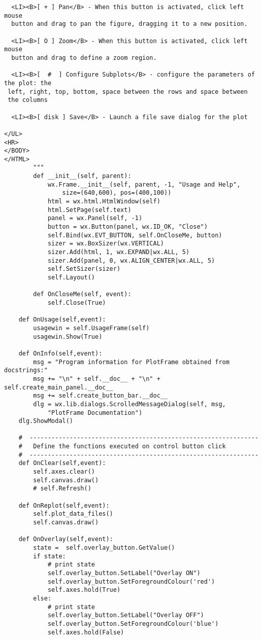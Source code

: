 \documentclass[12pt]{article}
\begin{document}
\begin{verbatim}
  <LI><B>[ + ] Pan</B> - When this button is activated, click left mouse
  button and drag to pan the figure, dragging it to a new position.

  <LI><B>[ O ] Zoom</B> - When this button is activated, click left mouse
  button and drag to define a zoom region.

  <LI><B>[  #  ] Configure Subplots</B> - configure the parameters of the plot: the
 left, right, top, bottom, space between the rows and space between
 the columns

  <LI><B>[ disk ] Save</B> - Launch a file save dialog for the plot

</UL>
<HR>
</BODY>
</HTML>
        """
        def __init__(self, parent):
            wx.Frame.__init__(self, parent, -1, "Usage and Help",
                size=(640,600), pos=(400,100))
            html = wx.html.HtmlWindow(self)
            html.SetPage(self.text)
            panel = wx.Panel(self, -1)
            button = wx.Button(panel, wx.ID_OK, "Close")
            self.Bind(wx.EVT_BUTTON, self.OnCloseMe, button)
            sizer = wx.BoxSizer(wx.VERTICAL)
            sizer.Add(html, 1, wx.EXPAND|wx.ALL, 5)
            sizer.Add(panel, 0, wx.ALIGN_CENTER|wx.ALL, 5)
            self.SetSizer(sizer)
            self.Layout()

        def OnCloseMe(self, event):
            self.Close(True)

    def OnUsage(self,event):
        usagewin = self.UsageFrame(self)
        usagewin.Show(True)

    def OnInfo(self,event):
        msg = "Program information for PlotFrame obtained from docstrings:"
        msg += "\n" + self.__doc__ + "\n" + self.create_main_panel.__doc__
        msg += self.create_button_bar.__doc__
        dlg = wx.lib.dialogs.ScrolledMessageDialog(self, msg,
            "PlotFrame Documentation")
	dlg.ShowModal()

    #  ---------------------------------------------------------------        
    #   Define the functions executed on control button click
    #  ---------------------------------------------------------------        
    def OnClear(self,event):
        self.axes.clear()
        self.canvas.draw()
        # self.Refresh()

    def OnReplot(self,event):
        self.plot_data_files()
        self.canvas.draw()

    def OnOverlay(self,event):
        state =  self.overlay_button.GetValue()
        if state:
            # print state
            self.overlay_button.SetLabel("Overlay ON")
            self.overlay_button.SetForegroundColour('red')
            self.axes.hold(True)
        else:
            # print state
            self.overlay_button.SetLabel("Overlay OFF")
            self.overlay_button.SetForegroundColour('blue')
            self.axes.hold(False)


\end{verbatim}
\end{document}
